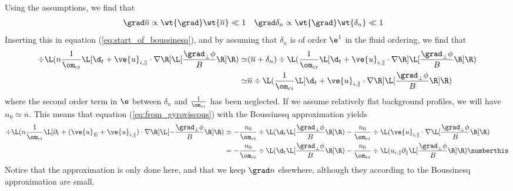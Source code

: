 Using the assumptions, we find that
%
\begin{align*}
    &\grad \overline{n} \propto \wt{\grad} \wt{\overline{n}} \ll 1
    &
    &\grad \delta_n \propto \wt{\grad} \wt{\delta_n} \ll 1&
\end{align*}
%
Inserting this in equation (\ref{eq:start_of_boussinesq}), and by assuming that
$\delta_n$ is of order $\e^1$ in the fluid ordering, we find that
%
\begin{align*}
 \div\L( n
  \frac{1}{\om_{ci}}
  \L[
      \d_t + \ve{u}_{i,\|}\cdot\nabla
  \R]
  \L[
     \frac{\grad_\perp \phi}{B}
  \R]
 \R)
 \simeq&
 (\overline{n} + \delta_n)\div\L(
  \frac{1}{\om_{ci}}
  \L[
      \d_t + \ve{u}_{i,\|}\cdot\nabla
  \R]
  \L[
     \frac{\grad_\perp \phi}{B}
  \R]
  \R)\\
 \simeq&
 \overline{n}\div\L(
  \frac{1}{\om_{ci}}
  \L[
      \d_t + \ve{u}_{i,\|}\cdot\nabla
  \R]
  \L[
     \frac{\grad_\perp \phi}{B}
  \R]
 \R)
\end{align*}
%
where the second order term in $\e$ between $\delta_n$ and $\frac{1}{\om_{ci}}$ has
been neglected. If we assume relatively flat background profiles, we will have
$n_0 \simeq \overline{n}$.  This means that equation
(\ref{eq:from_gyroviscous}) with the Boussinesq approximation yields
%
\begin{align*}
 \div\L( n
  \frac{1}{\om_{ci}}
  \L[ \partial_t + (\ve{u}_{E} + \ve{u}_{i,\|})\cdot\nabla \R]
  \L[ - \frac{\grad_\perp \phi}{B} \R] \R)
 &\simeq
 - \frac{n_0}{\om_{ci}} \div\L(
     \d_t \L[ \frac{\grad_\perp \phi}{B} \R] \R)
- \frac{n_0}{\om_{ci}} \div\L(
     \ve{u}_{i,\|}\cdot\nabla
 \L[ \frac{\grad_\perp \phi}{B} \R]
 \R)
 \\
 &=
 - \frac{n_0}{\om_{ci}} \div\L(
     \d_t \L[ \frac{\grad_\perp \phi}{B} \R] \R)
- \frac{n_0}{\om_{ci}} \div\L(
u_{i,\|}\partial_\| \L[ \frac{\grad_\perp \phi}{B} \R] \R)
\numberthis
\label{eq:boussinesq_vort}
\end{align*}
%
Notice that the approximation is only done here, and that we keep $\grad n$
elsewhere, although they according to the Boussinesq approximation are small.
